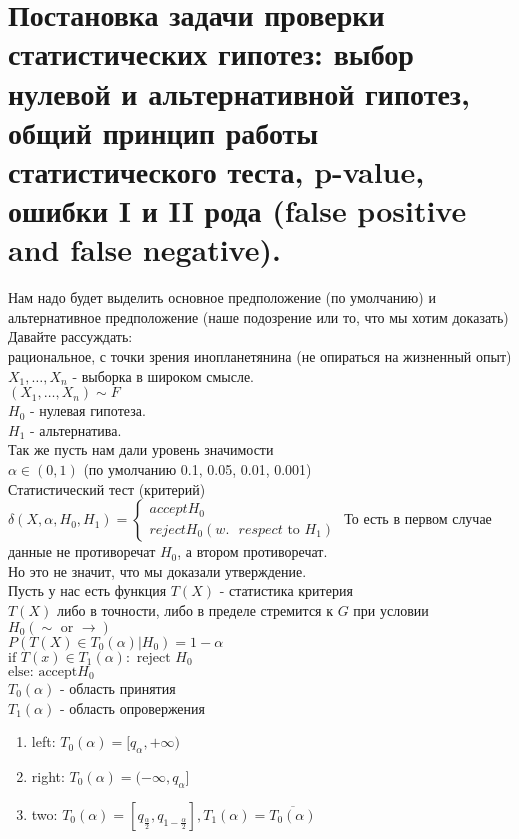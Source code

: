 \documentclass{article}
\newcommand\0{\mathbb{0}}
\newcommand\1{\mathbb{1}}
\begin{document}
\section{Постановка задачи проверки статистических гипотез: выбор нулевой и альтернативной гипотез, общий принцип работы статистического теста, p-value, ошибки I и II рода (false positive and false negative).}
Нам надо будет выделить основное предположение (по умолчанию) и альтернативное предположение (наше подозрение или то, что мы хотим доказать)\\
Давайте рассуждать:\\
рациональное, с точки зрения инопланетянина (не опираться на жизненный опыт)\\
$X_1, \dots, X_n$ - выборка в широком смысле.\\
$(X_1, \dots, X_n) \sim F$\\
$H_0$ - нулевая гипотеза.\\
$H_1$ - альтернатива.\\
Так же пусть нам дали уровень значимости\\
$\alpha \in (0, 1)$ (по умолчанию 0.1, 0.05, 0.01, 0.001)\\
Статистический тест (критерий)\\
$\delta(X, \alpha, H_0, H_1) = \begin{cases}
    accept H_0\\
    reject H_0 (w.\text{ } respect\text{ to } H_1)
\end{cases}$
То есть в первом случае данные не противоречат $H_0$, а втором противоречат.\\
Но это не значит, что мы доказали утверждение.\\
Пусть у нас есть функция $T(X)$ - статистика критерия\\
$T(X)$ либо в точности, либо в пределе стремится к $G$ при условии $H_0 (\sim \text{ or } \to)$\\
$P(T(X) \in T_0(\alpha) | H_0) = 1 - \alpha$\\
$\text{if } T(x) \in T_1(\alpha): \text{ reject } H_0$\\
$\text{else: accept} H_0$\\
$T_0(\alpha)$ - область принятия\\
$T_1(\alpha)$ - область опровержения\\
\begin{enumerate}
    \item left: $T_0(\alpha) = [q_\alpha, +\infty)$
    \item right: $T_0(\alpha) = (-\infty, q_\alpha]$
    \item two: $T_0(\alpha) = [q_{\frac{\alpha}{2}}, q_{1 - \frac{\alpha}{2}}], T_1(\alpha) = \overline{T_0(\alpha)}$
\end{enumerate}
\end{document}
